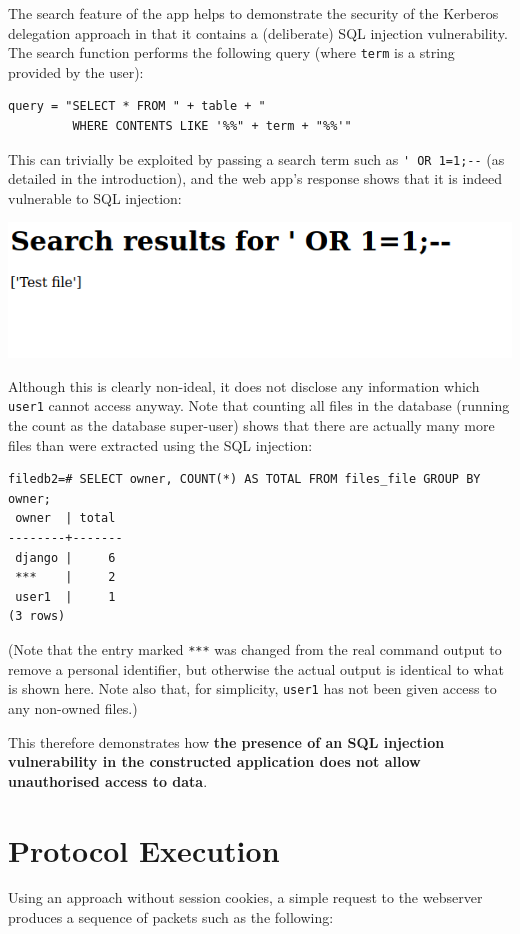 \documentclass[12pt]{report}
\begin{document}
The search feature of the app helps to demonstrate the security of the Kerberos delegation approach in that it contains a (deliberate) SQL injection vulnerability. The search function performs the following query (where \texttt{term} is a string provided by the user):

\begin{verbatim}
query = "SELECT * FROM " + table + "
         WHERE CONTENTS LIKE '%%" + term + "%%'"
\end{verbatim}

This can trivially be exploited by passing a search term such as \verb+' OR 1=1;--+ (as detailed in the introduction), and the web app's response shows that it is indeed vulnerable to SQL injection:

\begin{center}
  \includegraphics[scale=0.5]{08-browser4-sql.png}
\end{center}

Although this is clearly non-ideal, it does not disclose any information which \texttt{user1} cannot access anyway. Note that counting all files in the database (running the count as the database super-user) shows that there are actually many more files than were extracted using the SQL injection:

\begin{verbatim}
filedb2=# SELECT owner, COUNT(*) AS TOTAL FROM files_file GROUP BY owner;
 owner  | total
--------+-------
 django |     6
 ***    |     2
 user1  |     1
(3 rows)
\end{verbatim}

(Note that the entry marked \verb+***+ was changed from the real command output to remove a personal identifier, but otherwise the actual output is identical to what is shown here. Note also that, for simplicity, \texttt{user1} has not been given access to any non-owned files.)

This therefore demonstrates how \textbf{the presence of an SQL injection vulnerability in the constructed application does not allow unauthorised access to data}.

\section{Protocol Execution}
\label{sec:protocol_execution}
Using an approach without session cookies, a simple request to the webserver produces a sequence of packets such as the following:
\end{document}
